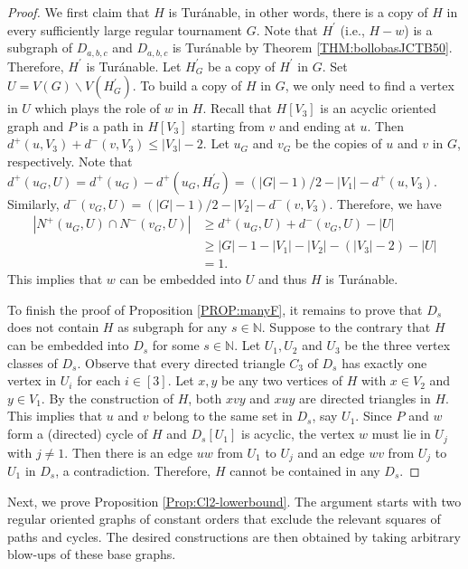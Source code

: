 \documentclass[11pt,a4paper,reqno]{amsart}
\theoremstyle{definition} %
\begin{document}
\begin{proof}
We first claim that $H$ is Tur\'anable, in other words, there is a copy of $H$ in every sufficiently large regular tournament $G$. Note that $H^{\prime}$ (i.e., $H-w$) is a subgraph of $D_{a,b,c}$ and $D_{a,b,c}$ is Tur\'anable by Theorem \ref{THM:bollobasJCTB50}. Therefore,  $H^{\prime}$ is Tur\'anable. Let $H_G^{\prime}$ be a copy of $H^\prime$ in $G$.  Set $U= V(G)\backslash V(H_G^{\prime})$.  To build a copy of $H$ in $G$, we only need to find a vertex in $U$ which plays the role of $w$ in $H$.  Recall that $H[V_3]$ is an acyclic oriented graph and $P$ is a path in $H[V_3]$ starting from $v$ and ending at $u$. Then $d^+(u,V_3)+d^-(v,V_3)\leqslant |V_3|-2$. Let $u_G$ and $v_G$ be the copies of $u$ and $v$ in $G$, respectively. Note that $d^+(u_G, U)=d^+(u_G)-d^+(u_G, H_G^{\prime})=(|G|-1)/2-|V_1|-d^+(u, V_3)$. Similarly, $d^-(v_G, U)=(|G|-1)/2-|V_2|-d^-(v, V_3)$. Therefore,  we have
\begin{equation*}
\begin{aligned}
|N^+(u_G, U)\cap N^-(v_G, U)| &\geqslant d^+(u_G, U)+d^-(v_G,U)-|U| \\
&\geqslant |G|-1-|V_1|-|V_2|-(|V_3|-2)-|U|\\
&= 1.
\end{aligned}
\end{equation*}
This implies that $w$ can be embedded into $U$ and thus $H$ is Tur\'anable.



To finish the proof of Proposition \ref{PROP:manyF}, it remains to prove that $D_s$ does not contain $H$ as subgraph for any $s\in \mathbb{N}$. Suppose to the contrary that $H$ can be embedded into $D_s$ for some $s\in \mathbb{N}$. Let $U_1, U_2$ and $U_3$ be the three vertex classes of $D_s$. Observe that every directed triangle $C_3$ of $D_s$ has exactly one vertex in $U_i$ for each $i\in[3]$.  Let $x, y$ be any two vertices of $H$ with $x\in V_2$ and $y\in V_1$. By the construction of $H$, both $xvy$ and $xuy$ are directed triangles in $H$.  This implies that $u$ and $v$ belong to the same set in $D_s$, say $U_1$. Since $P$ and $w$ form a (directed) cycle of $H$ and $D_s[U_1]$ is acyclic, the vertex $w$ must lie in $U_j$ with $j\neq 1$. Then there is an edge $uw$ from $U_1$ to $U_j$ and an edge $wv$ from $U_j$ to $U_1$ in $D_s$, a contradiction. Therefore, $H$ cannot be contained in any $D_s$.
\end{proof}

Next, we prove Proposition \ref{Prop:Cl2-lowerbound}. The argument starts with two regular oriented graphs of constant orders that exclude the relevant squares of paths and cycles. The desired constructions are then obtained by taking arbitrary blow-ups of these base graphs.
\end{document}
